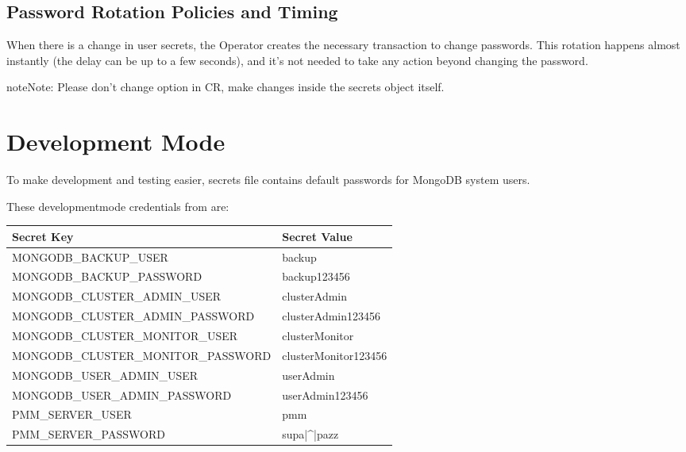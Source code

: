 \documentclass[letterpaper,10pt,english]{sphinxmanual}
\begin{document}
\subsection{Password Rotation Policies and Timing}
\label{\detokenize{users:password-rotation-policies-and-timing}}
When there is a change in user secrets, the Operator
creates the necessary transaction to change passwords. This rotation happens
almost instantly (the delay can be up to a few seconds), and it’s not needed to
take any action beyond changing the password.

\begin{sphinxadmonition}{note}{Note:}
Please don’t change  option in CR, make changes
inside the secrets object itself.
\end{sphinxadmonition}


\section{Development Mode}
\label{\detokenize{users:users-development-mode}}\label{\detokenize{users:id4}}
To make development and testing easier,  secrets
file contains default passwords for MongoDB system users.

These development\sphinxhyphen{}mode credentials from  are:


\begin{savenotes}\sphinxattablestart
\centering
\begin{tabulary}{\linewidth}[t]{|T|T|}
\hline
\sphinxstyletheadfamily 
Secret Key
&\sphinxstyletheadfamily 
Secret Value
\\
\hline
MONGODB\_BACKUP\_USER
&
backup
\\
\hline
MONGODB\_BACKUP\_PASSWORD
&
backup123456
\\
\hline
MONGODB\_CLUSTER\_ADMIN\_USER
&
clusterAdmin
\\
\hline
MONGODB\_CLUSTER\_ADMIN\_PASSWORD
&
clusterAdmin123456
\\
\hline
MONGODB\_CLUSTER\_MONITOR\_USER
&
clusterMonitor
\\
\hline
MONGODB\_CLUSTER\_MONITOR\_PASSWORD
&
clusterMonitor123456
\\
\hline
MONGODB\_USER\_ADMIN\_USER
&
userAdmin
\\
\hline
MONGODB\_USER\_ADMIN\_PASSWORD
&
userAdmin123456
\\
\hline
PMM\_SERVER\_USER
&
pmm
\\
\hline
PMM\_SERVER\_PASSWORD
&
supa|\textasciicircum{}|pazz
\\
\hline
\end{tabulary}
\par
\sphinxattableend\end{savenotes}
\end{document}
